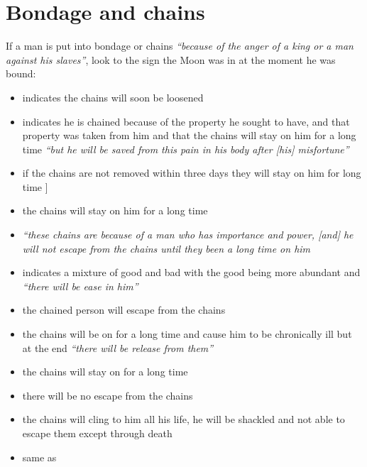 \section{Bondage and chains}
If a man is put into bondage or chains \textsl{``because of the anger of a king or a man against his slaves''}, look to the sign the Moon was in at the moment he was bound:
\begin{itemize}[topsep=0em,itemsep=0em]
\item[\Aries] indicates the chains will soon be loosened

\item[\Taurus] indicates he is chained because of the property he sought to have, and that property was taken from him and that the chains will stay on him for a long time \textsl{``but he will be saved from this pain in his body after [his] misfortune''}

\item[\Gemini] if the chains are not removed within three days they will stay on him for  long time
] 
\item[\Cancer] the chains will stay on him for a long time

\item[\Leo] \textsl{``these chains are because of a man who has importance and power, [and] he will not escape from the chains until they been a long time on him}

\item[\Virgo] indicates a mixture of good and bad with the good being more abundant and \textsl{``there will be ease in him''}

\item[\Libra] the chained person will escape from the chains

\item[\Scorpio] the chains will be on for a long time and cause him to be chronically ill but at the end \textsl{``there will be release from them''}

\item[\Sagittarius] the chains will stay on for a long time

\item[\Capricorn] there will be no escape from the chains

\item[\Aquarius] the chains will cling to him all his life, he will be shackled and not able to escape them except through death

\item[\Pisces] same as \Aquarius

\end{itemize}

